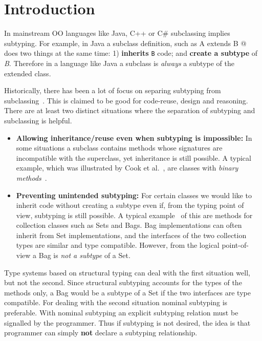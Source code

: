 \section{Introduction}\label{sec:intro}
\saveSpace\saveSpace
In mainstream OO languages like Java, C++ or C\# subclassing 
implies subtyping. For example, in Java a subclass definition, such as 
\Q@class A extends B {}@
\noindent does two things at the same time:
1) {\bf inherits} \lstinline{B} code; and {\bf create
a subtype} of \emph{B}. Therefore in a language like Java 
a subclass is \emph{always} a subtype of the extended class.

Historically, there has been a lot of focus on
separing subtyping from subclassing~\cite{cook}.  This is claimed to be
good for code-reuse, design and reasoning. There are at
least two distinct situations where the separation of subtyping and 
subclassing is helpful.

\begin{itemize}

\item {\bf Allowing inheritance/reuse even when subtyping is impossible:} 
In some situations a subclass contains methods whose signatures 
are incompatible with the superclass, yet inheritance is still
possible. A typical example, which was illustrated by Cook et al.~\cite{cook}, are 
classes with \emph{binary methods}~\cite{bruce96binary}.

\item {\bf Preventing unintended subtyping:} For certain classes we
  would like to inherit code without creating a subtype even if, from
  the typing point of view, subtyping is still possible. A typical
  example~\cite{LaLonde:1991:SSS:110673.110679} of this are methods for collection classes such as Sets and
  Bags. Bag implementations can often inherit 
  from Set implementations, and the interfaces of the two collection types are
  similar and type compatible. 
  However, from the logical point-of-view a Bag is \emph{not a
    subtype} of a Set. 

\end{itemize}

Type systems based on structural typing can deal with the first
situation well, but not the second. Since structural subtyping
accounts for the types of the methods only, a Bag would be a subtype
of a Set if the two interfaces are type compatible. For dealing with
the second situation nominal subtyping is preferable. With nominal
subtyping an explicit subtyping relation must be signalled by the
programmer. Thus if subtyping is not desired, the idea is that 
programmer can simply {\bf not} declare a subtyping relationship.

